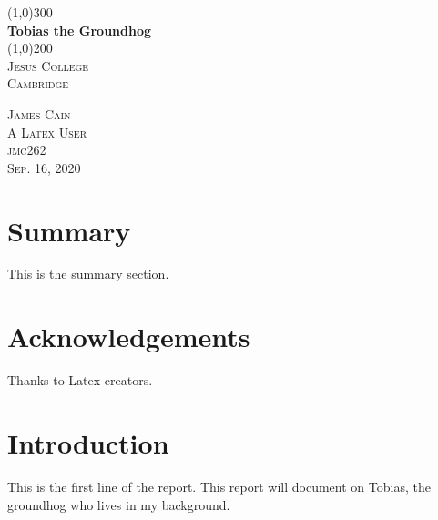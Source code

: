 \documentclass{article}
\begin{document}
\begin{titlepage}
    \begin{center}
    \line(1,0){300}\\
    [0.25in]
    \huge{\bfseries Tobias the Groundhog}\\
    [2mm]
    \line(1,0){200}\\
    [1.5cm]
    \textsc{\LARGE Jesus College}\\
    \textsc{\LARGE Cambridge}\\
    [10cm]
    \end{center}
    
    \begin{flushright}
    \textsc{\large James Cain \\
    A Latex User\\
    jmc262\\
    Sep. 16, 2020\\}
    \end{flushright}
\end{titlepage}

\section*{Summary}

This is the summary section. 
\cleardoublepage

\section*{Acknowledgements}
Thanks to Latex creators.
\cleardoublepage

\tableofcontents
\thispagestyle{empty}
\cleardoublepage

\listoffigures
{}
\cleardoublepage

\listoftables
{}
\cleardoublepage

\setcounter{page}{1}

\section{Introduction}\label{sec:intro}
This is the first line of the report. This report will document on Tobias, the groundhog who lives in my background.
\end{document}
